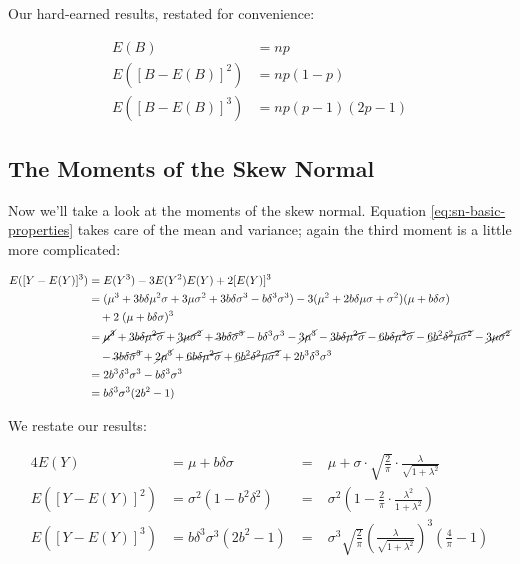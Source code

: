 \documentclass{article}
\begin{document}
Our hard-earned results, restated for convenience:

\begin{align}
  E(B) &= np \nonumber \\
  E([B - E(B)]^2) &= np(1-p) \\
  E([B - E(B)]^3) &= np(p-1)(2p-1) \nonumber
\end{align}

\subsection{The Moments of the Skew Normal}

Now we'll take a look at the moments of the skew normal. Equation
\eqref{eq:sn-basic-properties} takes care of the mean and variance; again the
third moment is a little more complicated:

\begin{align*}
  E([Y - E(Y)]^3) &= E(Y^3) - 3E(Y^2)E(Y) + 2[E(Y)]^3 \\
  &= (\mu^3 + 3 b \delta \mu^2 \sigma + 3 \mu \sigma^2 + 3 b \delta \sigma^3 - b \delta^3 \sigma^3) - 3 (\mu^2 + 2b \delta \mu \sigma + \sigma^2) (\mu + b \delta \sigma) \\
  & \quad + 2\;(\mu + b \delta \sigma)^3 \\
  &= \cancel{\mu^3} + \cancel{3 b \delta \mu^2 \sigma} + \cancel{3 \mu \sigma^2} + \cancel{3 b \delta \sigma^3} - b \delta^3 \sigma^3 - \cancel{3 \mu^3} - \cancel{3 b \delta \mu^2 \sigma} -
    \cancel{6 b \delta \mu^2 \sigma} - \cancel{6 b^2 \delta^2 \mu \sigma^2} - \cancel{3 \mu \sigma^2} \\
  & \quad - \cancel{3 b \delta \sigma^3} + \cancel{2 \mu^3} + \cancel{6 b \delta \mu^2 \sigma} + \cancel{6 b^2 \delta^2 \mu \sigma^2} + 2 b^3 \delta^3 \sigma^3 \\
  &= 2 b^3 \delta^3 \sigma^3 - b \delta^3 \sigma^3 \\
  &= b \delta^3 \sigma^3 (2b^2 - 1)
\end{align*}

We restate our results:

\begin{alignat}{4}
  E(Y) &= \mu + b \delta \sigma \;&=&\; \mu + \sigma \cdot \sqrt{\frac{2}{\pi}} \cdot \frac{\lambda}{\sqrt{1 + \lambda^2}} \nonumber \\
  E([Y - E(Y)]^2) &= \sigma^2 (1 - b^2 \delta^2) \;&=&\; \sigma^2 \left( 1 - \frac{2}{\pi} \cdot \frac{\lambda^2}{1 + \lambda^2} \right) \\
  E([Y - E(Y)]^3) &= b \delta^3 \sigma^3 (2b^2 - 1) \;&=&\; \sigma^3 \sqrt{\frac{2}{\pi}} \left( \frac{\lambda}{\sqrt{1 + \lambda^2}} \right)^3 \left( \frac{4}{\pi} - 1 \right) \nonumber
\end{alignat}
\end{document}
